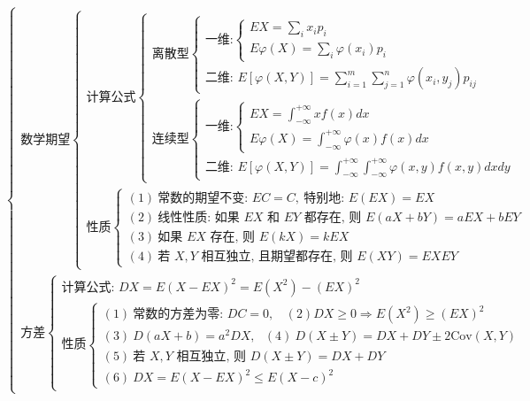 \documentclass[lang=cn,11pt]{elegantbook}
\begin{document}
\[
\begin{cases}
\text{数学期望}
\begin{cases}
\text{计算公式}
\begin{cases}
\text{离散型}
\begin{cases}
\text{一维:}
\begin{cases}
EX = \sum\limits_{i} x_i p_i \\
E\varphi(X) = \sum\limits_{i} \varphi(x_i) p_i
\end{cases} \\
\text{二维: } E[\varphi(X,Y)] = \sum\limits_{i=1}^{m} \sum\limits_{j=1}^{n} \varphi(x_i,y_j) p_{ij}
\end{cases} \\
\text{连续型}
\begin{cases}
\text{一维:}
\begin{cases}
EX = \int_{-\infty}^{+\infty} x f(x) dx \\
E\varphi(X) = \int_{-\infty}^{+\infty} \varphi(x) f(x) dx
\end{cases} \\
\text{二维: } E[\varphi(X,Y)] = \int_{-\infty}^{+\infty} \int_{-\infty}^{+\infty} \varphi(x,y) f(x,y) dxdy
\end{cases}
\end{cases} \\
\text{性质}
\begin{cases}
(1)\ \text{常数的期望不变: } EC=C,\ \text{特别地: } E(EX)=EX \\
(2)\ \text{线性性质: 如果 } EX \text{ 和 } EY \text{ 都存在, 则 } E(aX+bY)=aEX+bEY \\
(3)\ \text{如果 } EX \text{ 存在, 则 } E(kX)=kEX \\
(4)\ \text{若 } X,Y \text{ 相互独立, 且期望都存在, 则 } E(XY)=EXEY
\end{cases}
\end{cases} \\
\text{方差}
\begin{cases}
\text{计算公式: } DX=E(X-EX)^2=E(X^2)-(EX)^2 \\
\text{性质}
\begin{cases}
(1)\ \text{常数的方差为零: } DC=0,~~~~ (2) DX\geqslant0 \Rightarrow E(X^2)\geqslant (EX)^2 \\
(3)\ D(aX+b)=a^2 DX,~~~ (4)\ D(X\pm Y)=DX+DY\pm 2\text{Cov}(X,Y) \\
(5)\ \text{若 } X,Y \text{ 相互独立, 则 } D(X\pm Y)=DX+DY \\
(6)\ DX=E(X-EX)^2\leqslant E(X-c)^2
\end{cases}

\end{cases}
\end{cases}\]
\end{document}
